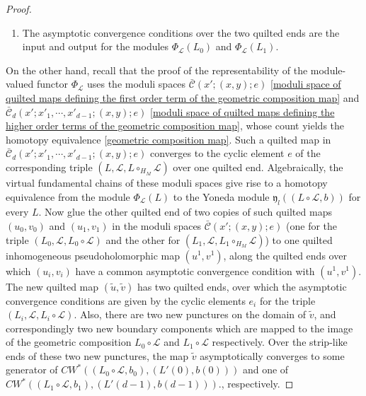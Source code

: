 \documentclass{amsart}
\numberwithin{equation}{section}
\numberwithin{figure}{section}
\begin{document}
\begin{proof}
\begin{enumerate}[label=(\roman*)]
\item The asymptotic convergence conditions over the two quilted ends are the input and output for the modules $\Phi_{\mathcal{L}}(L_{0})$ and $\Phi_{\mathcal{L}}(L_{1})$.

\end{enumerate}	\par

	On the other hand, recall that the proof of the representability of the module-valued functor $\Phi_{\mathcal{L}}$ uses the moduli spaces $\bar{\mathcal{C}}(x'; (x, y); e)$ \eqref{moduli space of quilted maps defining the first order term of the geometric composition map} and $\bar{\mathcal{C}}_{d}(x'; x'_{1}, \cdots, x'_{d-1}; (x, y); e)$ \eqref{moduli space of quilted maps defining the higher order terms of the geometric composition map}, whose count yields the homotopy equivalence \eqref{geometric composition map}. Such a quilted map in $\bar{\mathcal{C}}_{d}(x'; x'_{1}, \cdots, x'_{d-1}; (x, y); e)$ converges to the cyclic element $e$ of the corresponding triple $(L, \mathcal{L}, L \circ_{H_{M}} \mathcal{L})$ over one quilted end. Algebraically, the virtual fundamental chains of these moduli spaces give rise to a homotopy equivalence from the module $\Phi_{\mathcal{L}}(L)$ to the Yoneda module $\mathfrak{y}_{l}((L \circ \mathcal{L}, b))$ for every $L$.
Now glue the other quilted end of two copies of such quilted maps $(u_{0}, v_{0})$ and $(u_{1}, v_{1})$ in the moduli spaces $\bar{\mathcal{C}}(x'; (x, y); e)$ (one for the triple $(L_{0}, \mathcal{L}, L_{0} \circ \mathcal{L})$ and the other for $(L_{1}, \mathcal{L}, L_{1} \circ_{H_{M}} \mathcal{L})$) to one quilted inhomogeneous pseudoholomorphic map $(u^{1}, v^{1})$, along the quilted ends over which $(u_{i}, v_{i})$ have a common asymptotic convergence condition with $(u^{1}, v^{1})$. The new quilted map $(\tilde{u}, \tilde{v})$ has two quilted ends, over which the asymptotic convergence conditions are given by the cyclic elements $e_{i}$ for the triple $(L_{i}, \mathcal{L}, L_{i} \circ \mathcal{L})$. Also, there are two new punctures on the domain of $\tilde{v}$, and correspondingly two new boundary components which are mapped to the image of the geometric composition $L_{0} \circ \mathcal{L}$ and $L_{1} \circ \mathcal{L}$ respectively. Over the strip-like ends of these two new punctures, the map $\tilde{v}$ asymptotically converges to some generator of $CW^{*}((L_{0} \circ \mathcal{L}, b_{0}), (L'(0), b(0)))$ and one of $CW^{*}((L_{1} \circ \mathcal{L}, b_{1}), (L'(d-1), b(d-1)))$., respectively. \par

\end{proof}
\end{document}

